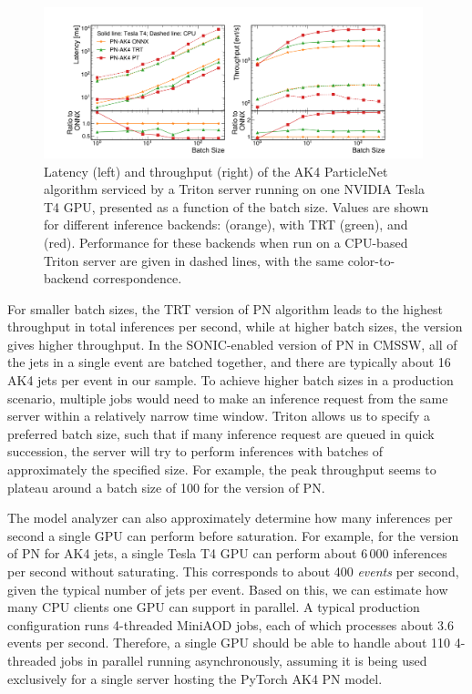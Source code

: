 \begin{figure}[ht]
    \centering
    \includegraphics[width=0.98\textwidth]{plots/latencies_throughputs_pn.pdf}
    \caption{Latency (left) and throughput (right) of the AK4 ParticleNet algorithm serviced by a Triton server running on one NVIDIA Tesla T4 GPU, presented as a function of the batch size. Values are shown for different inference backends: \ONNX (orange), \ONNX with TRT (green), and \PYTORCH (red). Performance for these backends when run on a CPU-based Triton server are given in dashed lines, with the same color-to-backend correspondence.}%
    \label{fig:throughputs_pn}
\end{figure}

For smaller batch sizes, the TRT version of PN algorithm leads to the highest throughput in total inferences per second, while at higher batch sizes, the \PYTORCH version gives higher throughput. In the SONIC-enabled version of PN in CMSSW, all of the jets in a single event are batched together, and there are typically about 16 AK4 jets per event in our \ttbar sample. To achieve higher batch sizes in a production scenario, multiple jobs would need to make an inference request from the same server within a relatively narrow time window. Triton allows us to specify a preferred batch size, such that if many inference request are queued in quick succession, the server will try to perform inferences with batches of approximately the specified size. For example, the peak throughput seems to plateau around a batch size of 100 for the \PYTORCH version of PN.%

The model analyzer can also approximately determine how many inferences per second a single GPU can perform before saturation. For example, for the \PYTORCH version of PN for AK4 jets, a single Tesla T4 GPU can perform about 6\,000 inferences per second without saturating. This corresponds to about 400 \textit{events} per second, given the typical number of jets per event.
Based on this, we can estimate how many CPU clients one GPU can support in parallel. A typical production configuration runs 4-threaded MiniAOD jobs, each of which processes about 3.6 events per second. Therefore, a single GPU should be able to handle about 110 4-threaded jobs in parallel running asynchronously, assuming it is being used exclusively for a single server hosting the PyTorch AK4 PN model.


